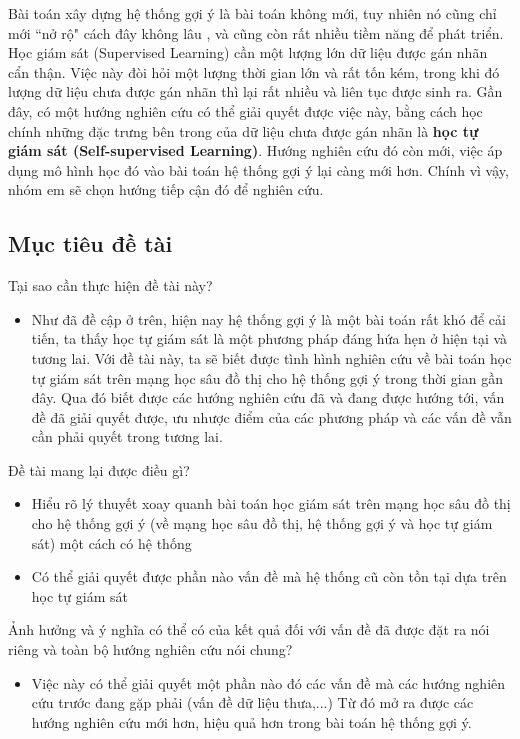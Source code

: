 \documentclass{article}[14pt]
\begin{document}
    Bài toán xây dựng hệ thống gợi ý là bài toán không mới, tuy nhiên nó cũng chỉ mới “nở rộ" cách đây không lâu \cite{soa}, và cũng còn rất nhiều tiềm năng để phát triển. Học giám sát (Supervised Learning) cần một lượng lớn dữ liệu được gán nhãn cẩn thận. Việc này đòi hỏi một lượng thời gian lớn và rất tốn kém, trong khi đó lượng dữ liệu chưa được gán nhãn thì lại rất nhiều và liên tục được sinh ra. Gần đây, có một hướng nghiên cứu có thể giải quyết được việc này, bằng cách học chính những đặc trưng bên trong của dữ liệu chưa được gán nhãn là \textbf{học tự giám sát (Self-supervised Learning)}. Hướng nghiên cứu đó còn mới, việc áp dụng mô hình học đó vào bài toán hệ thống gợi ý lại càng mới hơn. Chính vì vậy, nhóm em sẽ chọn hướng tiếp cận đó để nghiên cứu.
    
    
    \subsection{Mục tiêu đề tài}
    
    Tại sao cần thực hiện đề tài này?
    \begin{itemize}
        \item Như đã đề cập ở trên, hiện nay hệ thống gợi ý là một bài toán rất khó để cải tiến, ta thấy học tự giám sát là một phương pháp đáng hứa hẹn ở hiện tại và tương lai. Với đề tài này, ta sẽ biết được tình hình nghiên cứu về bài toán học tự giám sát trên mạng học sâu đồ thị cho hệ thống gợi ý trong thời gian gần đây. Qua đó biết được các hướng nghiên cứu đã và đang được hướng tới, vấn đề đã giải quyết được, ưu nhược điểm của các phương pháp và các vấn đề vẫn cần phải quyết trong tương lai.
    \end{itemize}
    Đề tài mang lại được điều gì?
    \begin{itemize}
        \item Hiểu rõ lý thuyết xoay quanh bài toán học giám sát trên mạng học sâu đồ thị cho hệ thống gợi ý (về mạng học sâu đồ thị, hệ thống gợi ý và học tự giám sát) một cách có hệ thống
        \item Có thể giải quyết được phần nào vấn đề mà hệ thống cũ còn tồn tại dựa trên học tự giám sát
    \end{itemize}
    Ảnh hưởng và ý nghĩa có thể có của kết quả đối với vấn đề đã được đặt ra nói riêng và toàn bộ hướng nghiên cứu nói chung?
    \begin{itemize}
        \item Việc này có thể giải quyết một phần nào đó các vấn đề mà các hướng nghiên cứu trước đang gặp phải (vấn đề dữ liệu thưa,...) Từ đó mở ra được các hướng nghiên cứu mới hơn, hiệu quả hơn trong bài toán hệ thống gợi ý.
    \end{itemize}
\end{document}
